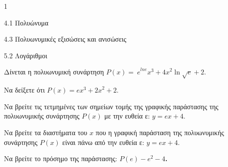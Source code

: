 \begin{ylh}{1}
\item 4.1 Πολυώνυμα
\item 4.3 Πολυωνυμικές εξισώσεις και ανισώσεις
\item 5.2 Λογάριθμοι
\end{ylh}
Δίνεται η πολυωνυμική συνάρτηση ${P(x) = \ e}^{lne}x^{3} + {4x}^{2}\ln\sqrt{e} + 2$.
\begin{alist}
\item Να δείξετε ότι $P(x) = ex^{3} + {2x}^{2} + 2$.
\item Να βρείτε τις τετμημένες των σημείων τομής της γραφικής παράστασης της πολυωνυμικής συνάρτησης $P(x)$ με την ευθεία ε: $y = ex + 4$.
\item Να βρείτε τα διαστήματα του $x$ που η γραφική παράσταση της πολυωνυμικής συνάρτησης $P(x)$ είναι πάνω από την ευθεία ε: $y = ex + 4$.
\item Να βρείτε το πρόσημο της παράστασης: $P(e) - e^{2} - 4$\textbf{.}
\end{alist}


